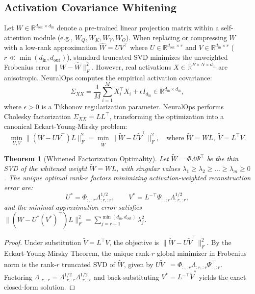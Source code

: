 \documentclass{article}
\newtheorem{theorem}{Theorem}
\begin{document}
\subsection{Activation Covariance Whitening}
Let $W \in \mathbb{R}^{d_{\text{out}} \times d_{\text{in}}}$ denote a pre-trained linear projection matrix within a self-attention module (e.g., $W_Q, W_K, W_V, W_O$). When replacing or compressing $W$ with a low-rank approximation $\hat{W} = U V^\top$ where $U \in \mathbb{R}^{d_{\text{out}} \times r}$ and $V \in \mathbb{R}^{d_{\text{in}} \times r}$ ($r \ll \min(d_{\text{in}}, d_{\text{out}})$), standard truncated SVD minimizes the unweighted Frobenius error $\|W - \hat{W}\|_F^2$. However, real activations $X \in \mathbb{R}^{B \times N \times d_{\text{in}}}$ are anisotropic. NeuralOps computes the empirical activation covariance:
\begin{equation}
    \Sigma_{XX} = \frac{1}{M} \sum_{i=1}^M X_i^\top X_i + \epsilon I_{d_{\text{in}}} \in \mathbb{R}^{d_{\text{in}} \times d_{\text{in}}},
\end{equation}
where $\epsilon > 0$ is a Tikhonov regularization parameter. NeuralOps performs Cholesky factorization $\Sigma_{XX} = L L^\top$, transforming the optimization into a canonical Eckart-Young-Mirsky problem:
\begin{equation}
    \min_{U, V} \|(W - U V^\top) L\|_F^2 = \min_{\tilde{W}} \|\tilde{W} - U \tilde{V}^\top\|_F^2, \quad \text{where } \tilde{W} = W L, \; \tilde{V} = L^\top V.
\end{equation}

\begin{theorem}[Whitened Factorization Optimality]
\label{thm:whitening_opt}
Let $\tilde{W} = \Phi \Lambda \Psi^\top$ be the thin SVD of the whitened weight $\tilde{W} = W L$, with singular values $\lambda_1 \ge \lambda_2 \ge \dots \ge \lambda_m \ge 0$. The unique optimal rank-$r$ factors minimizing activation-weighted reconstruction error are:
\begin{equation}
    U^* = \Phi_{:, :r} \Lambda_{:r, :r}^{1/2}, \qquad V^* = L^{-\top} \Psi_{:, :r} \Lambda_{:r, :r}^{1/2},
\end{equation}
and the minimal approximation error satisfies $\|(W - U^* (V^*)^\top) L\|_F^2 = \sum_{j=r+1}^{\min(d_{\text{in}}, d_{\text{out}})} \lambda_j^2$.
\end{theorem}
\begin{proof}
Under substitution $\tilde{V} = L^\top V$, the objective is $\|\tilde{W} - U \tilde{V}^\top\|_F^2$. By the Eckart-Young-Mirsky Theorem, the unique rank-$r$ global minimizer in Frobenius norm is the rank-$r$ truncated SVD of $\tilde{W}$, given by $U \tilde{V}^\top = \Phi_{:, :r} \Lambda_{:r, :r} \Psi_{:, :r}^\top$. Factoring $\Lambda_{:r, :r} = \Lambda_{:r, :r}^{1/2} \Lambda_{:r, :r}^{1/2}$ and back-substituting $V^* = L^{-\top} \tilde{V}^*$ yields the exact closed-form solution.
\end{proof}
\end{document}
